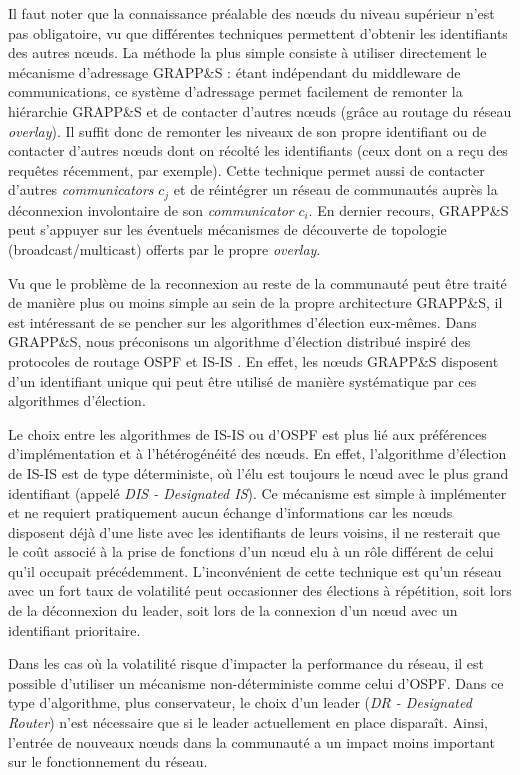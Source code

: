 Il faut noter que la connaissance préalable des n{\oe}uds du niveau supérieur n'est pas obligatoire, vu que différentes techniques permettent d'obtenir les identifiants des autres n{\oe}uds. La méthode la plus simple consiste à utiliser directement le mécanisme d'adressage GRAPP\&S : étant indépendant du middleware de communications, ce système d'adressage permet facilement de remonter la hiérarchie GRAPP\&S et de contacter d'autres n{\oe}uds (grâce au routage du réseau \textit{overlay}). Il suffit donc de remonter les niveaux de son propre identifiant ou de contacter d'autres n{\oe}uds dont on récolté les identifiants (ceux dont on a reçu des requêtes récemment, par exemple). Cette technique permet aussi de contacter d'autres \textit{communicators} $c_j$ et de réintégrer un réseau de communautés auprès la déconnexion involontaire de son \textit{communicator} $c_i$. En dernier recours, GRAPP\&S peut s'appuyer sur les éventuels mécanismes de découverte de topologie (broadcast/multicast) offerts par le propre \textit{overlay}.

Vu que le problème de la reconnexion au reste de la communauté peut être traité de manière plus ou moins simple au sein de la propre architecture GRAPP\&S, il est intéressant de se pencher sur les algorithmes d'élection eux-mêmes. Dans GRAPP\&S, nous préconisons un algorithme d'élection distribué inspiré des protocoles de routage OSPF et IS-IS \cite{rfc1142,rfc2328,ISISxOSPF}. En effet, les n{\oe}uds GRAPP\&S disposent d'un identifiant unique qui peut être utilisé de manière systématique par ces algorithmes d'élection. 

Le choix entre les algorithmes de IS-IS ou d'OSPF est plus lié aux préférences d'implémentation et à l'hétérogénéité des n{\oe}uds. En effet, l'algorithme d'élection de IS-IS est de type déterministe, où l'élu est toujours le n{\oe}ud avec le plus grand identifiant (appelé \textit{DIS - Designated IS}). Ce mécanisme est simple à implémenter et ne requiert pratiquement aucun échange d'informations car les n{\oe}uds disposent déjà d'une liste avec les identifiants de leurs voisins, il ne resterait que le coût associé à la prise de fonctions d'un n{\oe}ud elu à un rôle différent de celui qu'il occupait précédemment. L'inconvénient de cette technique est qu'un réseau avec un fort taux de volatilité peut occasionner des élections à répétition, soit lors de la déconnexion du leader, soit lors de la connexion d'un n{\oe}ud avec un identifiant prioritaire.

Dans les cas où la volatilité risque d'impacter la performance du réseau, il est possible d'utiliser un mécanisme non-déterministe comme celui d'OSPF. Dans ce type d'algorithme, plus conservateur, le choix d'un leader (\textit{DR - Designated Router}) n'est nécessaire que si le leader actuellement en place disparaît. Ainsi, l'entrée de nouveaux n{\oe}uds dans la communauté a un impact moins important sur le fonctionnement du réseau.

